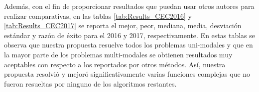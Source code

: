 Además, con el fin de proporcionar resultados que puedan usar otros autores para realizar comparativas, en las tablas \ref{tab:Results_CEC2016} y \ref{tab:Results_CEC2017} 
se reporta el mejor, peor, mediana, media, desviación estándar y razón de éxito para el \CEC{} 2016 y 2017, respectivamente.
%
En estas tablas se observa que nuestra propuesta resuelve todos los problemas uni-modales y que en la mayor parte de los problemas multi-modales
se obtienen resultados muy aceptables con respecto a los reportados por otros métodos.
%
%
Así, nuestra propuesta resolvió y mejoró significativamente varias funciones complejas que no fueron resueltas por ninguno de los algoritmos restantes.
%
